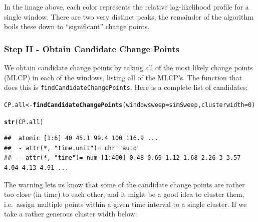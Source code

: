 \documentclass[10pt]{article}\usepackage[]{graphicx}\usepackage[]{color}
\makeatletter
\newcommand{\hlnum}[1]{\textcolor[rgb]{0.686,0.059,0.569}{#1}}%
\newcommand{\hlstd}[1]{\textcolor[rgb]{0.345,0.345,0.345}{#1}}%
\newcommand{\hlkwb}[1]{\textcolor[rgb]{0.69,0.353,0.396}{#1}}%
\newcommand{\hlkwc}[1]{\textcolor[rgb]{0.333,0.667,0.333}{#1}}%
\newcommand{\hlkwd}[1]{\textcolor[rgb]{0.737,0.353,0.396}{\textbf{#1}}}%
\newenvironment{kframe}{%
 \def\at@end@of@kframe{}%
 \ifinner\ifhmode%
  \def\at@end@of@kframe{\end{minipage}}%
  \begin{minipage}{\columnwidth}%
 \fi\fi%
 \def\FrameCommand##1{\hskip\@totalleftmargin \hskip-\fboxsep
 \colorbox{shadecolor}{##1}\hskip-\fboxsep
     \hskip-\linewidth \hskip-\@totalleftmargin \hskip\columnwidth}%
 \MakeFramed {\advance\hsize-\width
   \@totalleftmargin\z@ \linewidth\hsize
   \@setminipage}}%
 {\par\unskip\endMakeFramed%
 \at@end@of@kframe}
\newenvironment{knitrout}{}{} %
\makeatother
\begin{document}
\noindent In the image above, each color represents the relative log-likelihood profile for a single window. There are two very distinct peaks, the remainder of the algorithm boils these down to ``significant'' change points. 

\subsubsection{Step II - Obtain Candidate Change Points} 

We obtain candidate change points by taking all of the most likely change points (MLCP) in each of the windows, listing all of the MLCP's.  The function that does this is \texttt{findCandidateChangePoints}.  Here is a complete list of candidates:

\begin{knitrout}
\color{fgcolor}\begin{kframe}
\begin{alltt}
\hlstd{CP.all} \hlkwb{<-} \hlkwd{findCandidateChangePoints}\hlstd{(}\hlkwc{windowsweep} \hlstd{= simSweep,} \hlkwc{clusterwidth} \hlstd{=} \hlnum{0}\hlstd{)}
\end{alltt}


{\ttfamily\noindent\itshape\color{messagecolor}{\#\# Note: clustering candidate change points at 0 time units collapsed 6 candidate change points to 6 change points.}}

{\ttfamily\noindent\color{warningcolor}{\#\# Warning in findCandidateChangePoints(windowsweep = simSweep, clusterwidth = 0): \\\#\#\ \ Some of your partitions are very small - probably too small. You might consider re-clustering the change points with a threshold of at least 0.61.}}\begin{alltt}
\hlkwd{str}\hlstd{(CP.all)}
\end{alltt}
\begin{verbatim}
##  atomic [1:6] 40 45.1 99.4 100 116.9 ...
##  - attr(*, "time.unit")= chr "auto"
##  - attr(*, "time")= num [1:400] 0.48 0.69 1.12 1.68 2.26 3 3.57 4.04 4.13 4.91 ...
\end{verbatim}
\end{kframe}
\end{knitrout}

\noindent The warning lets us know that some of the candidate change points are rather too close (in time) to each other, and it might be a good idea to cluster them, i.e.~assign multiple points within a given time interval to a single cluster. If we take a rather generous cluster width below: 
\end{document}
